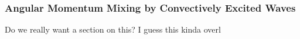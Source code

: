 {\color{purple}
\subsubsection{Angular Momentum Mixing by Convectively Excited Waves}}

Do we really want a section on this?  I guess this kinda overl
